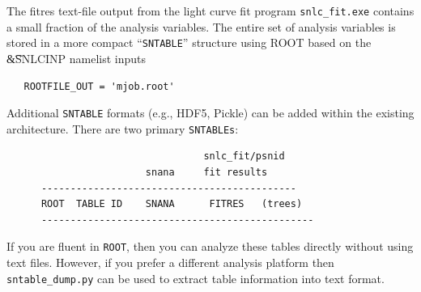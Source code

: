 \documentclass[12pt]{article}
\newcommand{\sndump}{{\tt sntable\_dump.py}}
\begin{document}
{The fitres text-file output from the light curve fit program {\tt snlc\_fit.exe}
contains a small fraction of the analysis variables.
The entire set of analysis variables is stored in a more
compact ``{\tt SNTABLE}'' structure using ROOT
based on the {\t\&SNLCINP} namelist inputs 
\begin{verbatim}
   ROOTFILE_OUT = 'mjob.root'
\end{verbatim} 
%
Additional {\tt SNTABLE} formats (e.g., HDF5, Pickle)
can be added within the existing architecture.
There are two primary {\tt SNTABLEs}:
%
\begin{verbatim}
                                  snlc_fit/psnid
                        snana     fit results
      --------------------------------------------
      ROOT  TABLE ID    SNANA      FITRES   (trees)
      -----------------------------------------------
\end{verbatim} 
%
If you are fluent in {\tt ROOT},
then you can analyze these tables directly without
using text files. However, if you prefer a different
analysis platform then {\sndump} can be used to
extract table information into text format.

}
\end{document}
